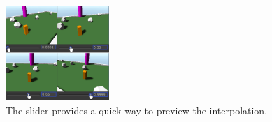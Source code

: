 
\begin{figure}[htbp]
\centering
\includegraphics[width=0.35\textwidth]{Pics/slider}
\caption{The slider provides a quick way to preview the interpolation.}
\label{fig:slider}
\end{figure}

